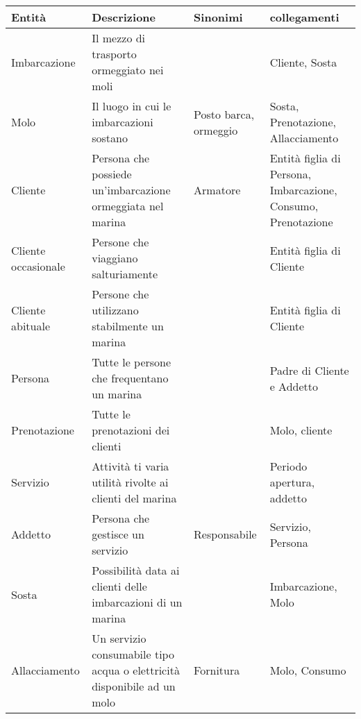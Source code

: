 \begin{center}
    \begin{tabularx}{\textwidth}{|>{\RaggedRight}p{2cm}|p{7cm}|p{2.4cm}|>{\RaggedRight}X|}
        \hline
        \rowcolor{gray!30}
        \textbf{Entità} & \textbf{Descrizione} & \textbf{Sinonimi} & \textbf{collegamenti} \\
        \hline
        Imbarcazione & Il mezzo di trasporto ormeggiato nei moli &  & Cliente, Sosta\\
        
        \hline
        Molo & Il luogo in cui le imbarcazioni sostano & Posto barca, ormeggio & Sosta, Prenotazione, Allacciamento\\
        
        \hline
        Cliente& Persona che possiede un'imbarcazione ormeggiata nel  marina & Armatore & Entità figlia di Persona, Imbarcazione, Consumo, Prenotazione\\
        
        \hline
        Cliente occasionale &Persone che viaggiano salturiamente & & Entità figlia di Cliente  \\
         
        \hline
        Cliente abituale & Persone che utilizzano stabilmente un marina &  & Entità figlia di Cliente \\
          
        \hline
        Persona& Tutte le persone che frequentano un marina   &  & Padre di Cliente e Addetto \\  
        
        \hline
        Prenotazione & Tutte le prenotazioni dei clienti &  & Molo, cliente \\
        
        \hline
        Servizio & Attività ti varia utilità rivolte ai clienti del marina &  & Periodo apertura, addetto \\
        
        \hline
        Addetto & Persona che gestisce un servizio & Responsabile & Servizio, Persona \\
         
        \hline
        Sosta & Possibilità data ai clienti delle imbarcazioni di un marina  & & Imbarcazione, Molo \\
        
        \hline
        Allacciamento & Un servizio consumabile tipo acqua o elettricità disponibile ad un molo & Fornitura & Molo, Consumo\\
        

\end{tabularx}
\end{center}
